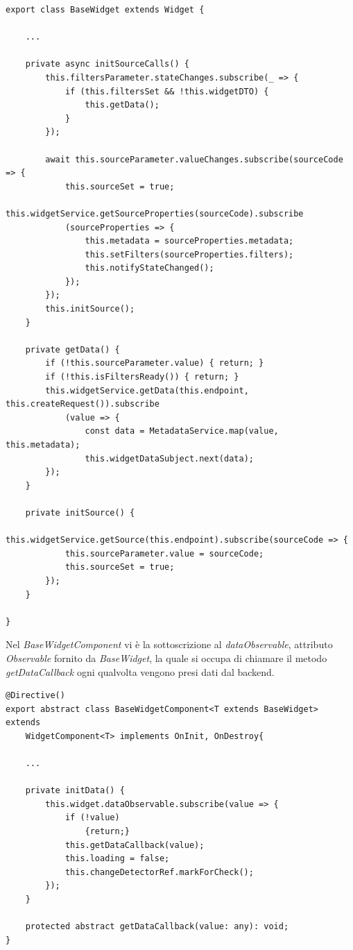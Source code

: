\begin{lstlisting}[caption={Classe BaseWidget, inizializzazione dei parametri}, style=javaScriptCode]
export class BaseWidget extends Widget {
    
    ...
    
    private async initSourceCalls() {
        this.filtersParameter.stateChanges.subscribe(_ => {
            if (this.filtersSet && !this.widgetDTO) {
                this.getData();
            }
        });

        await this.sourceParameter.valueChanges.subscribe(sourceCode => {
            this.sourceSet = true;
            this.widgetService.getSourceProperties(sourceCode).subscribe
            (sourceProperties => {
                this.metadata = sourceProperties.metadata;
                this.setFilters(sourceProperties.filters);
                this.notifyStateChanged();
            });
        });
        this.initSource();
    }

    private getData() {
        if (!this.sourceParameter.value) { return; }
        if (!this.isFiltersReady()) { return; }
        this.widgetService.getData(this.endpoint, this.createRequest()).subscribe
            (value => {
                const data = MetadataService.map(value, this.metadata);
                this.widgetDataSubject.next(data);
        });
    }

    private initSource() {
        this.widgetService.getSource(this.endpoint).subscribe(sourceCode => {
            this.sourceParameter.value = sourceCode;
            this.sourceSet = true;
        });
    }

}
\end{lstlisting}
Nel \textit{BaseWidgetComponent} vi è la sottoscrizione al \textit{dataObservable}, attributo \textit{Observable} fornito da \textit{BaseWidget}, la quale si occupa di chiamare il metodo \textit{getDataCallback} ogni qualvolta vengono presi dati dal backend.
\begin{lstlisting}[caption={Classe BaseWidgetComponent, metodi d'inizializzazione dei dati}, style=javaScriptCode]
@Directive()
export abstract class BaseWidgetComponent<T extends BaseWidget> extends 
    WidgetComponent<T> implements OnInit, OnDestroy{

    ...
        
    private initData() {
        this.widget.dataObservable.subscribe(value => {
            if (!value)
                {return;}
            this.getDataCallback(value);
            this.loading = false;
            this.changeDetectorRef.markForCheck();
        });
    }

    protected abstract getDataCallback(value: any): void;
}
\end{lstlisting}

